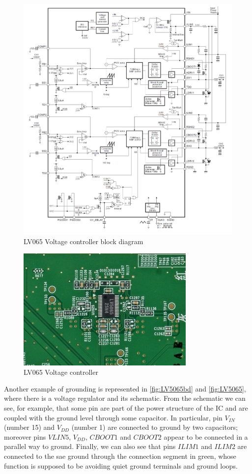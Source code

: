 \documentclass[11pt,a4paper,titlepage]{article}
\begin{document}
      \begin{figure}[htbp]
					\centering
          \includegraphics[width = \textwidth]{LV5065_block_diag.png}
          \caption{LV065 Voltage controller block diagram}
          \label{fig:LV5065bd}
    	\end{figure}
      \begin{figure}[htbp]
				\centering
        \includegraphics[width =.6\textwidth]{LV5065.png}
        \caption{LV065 Voltage controller}
        \label{fig:LV5065}
      \end{figure}

      Another example of grounding is represented in \autoref{fig:LV5065bd} and \autoref{fig:LV5065}, where there is a voltage regulator and its schematic. From the schematic we can see, for example, that some pin are part of the power structure of the IC and are coupled with the ground level through some capacitor. In particular, pin $V_{IN}$ (number 15) and $V_{DD}$ (number 1) are connected to ground by two capacitors; moreover pins $VLIN5$, $V_{DD}$, $CBOOT1$ and $CBOOT2$ appear to be connected in a parallel way to ground. Finally, we can also see that pins $ILIM1$ and $ILIM2$ are connected to the sae ground through the connection segment in green, whose function is supposed to be avoiding quiet ground terminals and ground loops.
\end{document}
